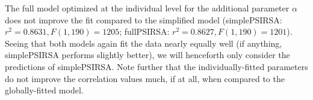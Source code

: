 \documentclass[10pt,a4paper]{article}
\newcommand{\gcs}[1]{\textcolor{blue}{[gcs: #1]}}
\begin{document}
The full model optimized at the individual level for the additional parameter $\alpha$ does not improve the fit compared to the simplified model (simplePSIRSA: $r^{2}=0.8631, F(1,190) = 1205$; fullPSIRSA: $r^{2}=0.8627, F(1,190) = 1201$). 
Seeing that both models again fit the data nearly equally well (if anything, simplePSIRSA performs slightly better), we will henceforth only consider the predictions of simplePSIRSA.
Note further that the individually-fitted parameters do not improve the correlation values much, if at all, when compared to the globally-fitted model. 







\end{document}
